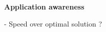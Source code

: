 \documentclass[Main]{subfiles}
\begin{document}
\textbf{Application awareness}

- Speed over optimal solution ?
\end{document}

